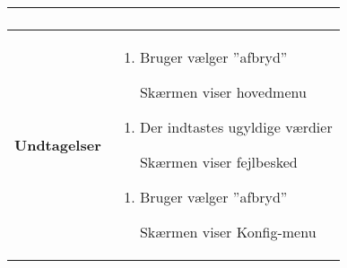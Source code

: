 \begin{center}
\begin{longtable}{|p{5cm}|p{9cm}|}
\begin{enumerate}
	
			\end{enumerate}\\\hline
		\textbf{Undtagelser}
			&\begin{enumerate}[label=\ref{uc2afbryd}.a]
				
				\item Bruger vælger ''afbryd''
				
					\subitem Skærmen viser hovedmenu
			\end{enumerate}
			
			\begin{enumerate}[label=\ref{uc2afbryd2}.a]
				
				\item Der indtastes ugyldige værdier	
				
					\subitem Skærmen viser fejlbesked
			\end{enumerate}			
			
			\begin{enumerate}[label=\ref{uc2afbryd3}.a]
				
				\item Bruger vælger ''afbryd''
				
				\subitem Skærmen viser Konfig-menu
				

			\end{enumerate}														\\\hline
	\end{longtable}
\end{center}

